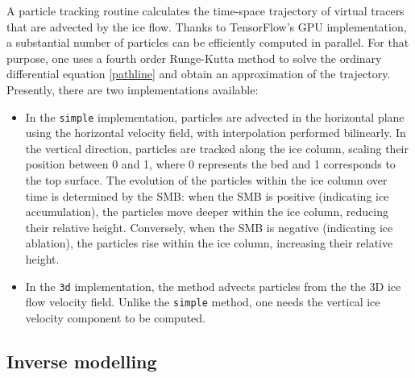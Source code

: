 \documentclass[gmd]{copernicus}
\begin{document}
A particle tracking routine calculates the time-space trajectory of virtual tracers that are advected by the ice flow. Thanks to TensorFlow's GPU implementation, a substantial number of particles can be efficiently computed in parallel. For that purpose, one uses a fourth order Runge-Kutta method to solve the ordinary differential equation \eqref{pathline} and obtain an approximation of the trajectory. Presently, there are two implementations available:
\begin{itemize}
\item In the \texttt{simple} implementation, particles are advected in the horizontal plane using the horizontal velocity field, with interpolation performed bilinearly. In the vertical direction, particles are tracked along the ice column, scaling their position between 0 and 1, where 0 represents the bed and 1 corresponds to the top surface. The evolution of the particles within the ice column over time is determined by the SMB: when the SMB is positive (indicating ice accumulation), the particles move deeper within the ice column, reducing their relative height. Conversely, when the SMB is negative (indicating ice ablation), the particles rise within the ice column, increasing their relative height. 
\item  In the \texttt{3d} implementation, the method advects particles from the the 3D ice flow velocity field. Unlike the \texttt{simple} method, one needs the vertical ice velocity component to be computed.
\end{itemize}
 
\subsection{Inverse modelling}
\label{inv_model} 
 
\end{document}
